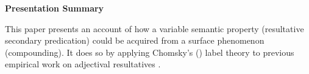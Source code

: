 \documentclass[letterpaper]{article}
\begin{document}
\textbf{Presentation Summary}

This paper presents an account of how a variable semantic property (resultative secondary predication) could be acquired from a surface phenomenon (compounding).
It does so by applying Chomsky's (\citeyear{chomsky2013problems,chomsky2015problems}) label theory to previous empirical work on adjectival resultatives \parencite{snyder2001nature,kratzer_building_2004}.

\printbibliography
\end{document}

